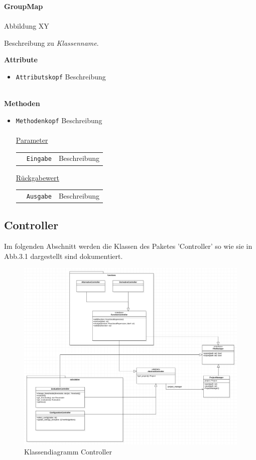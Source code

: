 \documentclass{article}
\begin{document}
\newpage
\textbf{\large{GroupMap}}\\\\
Abbildung XY

Beschreibung zu \textit{Klassenname}.
\newline \newline

\textbf{{Attribute}}
\begin{itemize}
\item \texttt{Attributskopf} \newline Beschreibung
\\\\
\end{itemize}

\textbf{{Methoden}}
\begin{itemize}
\item \texttt{Methodenkopf} \newline Beschreibung
\\\\
\underline{{Parameter}}

\begin{tabular}{lll}
 & \texttt{Eingabe} & Beschreibung \\
\end{tabular}

\underline{{Rückgabewert}}

\begin{tabular}{lll}
 & \texttt{Ausgabe} & Beschreibung \\
\end{tabular}
\end{itemize}

\newpage
\subsection{Controller}

Im folgenden Abschnitt werden die Klassen des Paketes 'Controller' so wie sie in Abb.3.1 dargestellt sind dokumentiert.

\begin{figure}[H]%
    \centering
    \includegraphics[width=13cm]{entwurf/Entwurf_dokument/img/Floriane/ControllerklassendiagrammTemporaer.png}
    \caption{Klassendiagramm Controller}
\end{figure}
\end{document}
